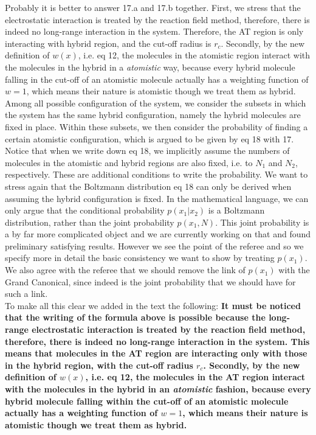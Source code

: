 \documentclass[a4paper]{article}
\begin{document}
Probably it is better to answer 17.a and 17.b together.  First, we
stress that the electrostatic interaction is treated by the reaction
field method, therefore, there is indeed no long-range interaction in
the system. Therefore, the AT region is only interacting with hybrid
region, and the cut-off radius is $r_c$. Secondly, by the new
definition of $w(x)$, i.e. eq 12, the molecules in the atomistic
region interact with the molecules in the hybrid in a 
\emph{atomistic} way, because every hybrid molecule falling in the cut-off of
an atomistic molecule actually has a weighting function of $w=1$,
which means their nature is atomistic though we treat them as hybrid.
Among all possible configuration of the system, we consider
the subsets in which the system has the same hybrid configuration,
namely the hybrid molecules are fixed in place. Within
these subsets, we then
consider the probability of finding a certain atomistic configuration,
which
is argued to be given by eq 18 with 17.
Notice that when we write down eq 18, we implicitly assume
the numbers of molecules in the atomistic and hybrid regions
are also fixed, i.e. to $N_1$ and $N_2$, respectively.
These are additional conditions to write the probability.
We want to stress again that the Boltzmann distribution eq 18
can only be derived when assuming the hybrid configuration
is fixed. In the mathematical language, we can only argue
that the conditional probability $p(x_1|x_2)$ is a Boltzmann distribution,
rather than the joint probability $p(x_1, N)$. This joint probability is a by far more complicated object and we are currently working on that and found preliminary satisfying results. 
However we see the point of the referee and so we specify more in detail the basic consistency we want to show by treating $p(x_1)$. We also agree with the referee that we should remove the link of $p(x_1)$ with the Grand Canonical, since indeed is the joint probability that we should have for such a link.\\
To make all this clear we added in the text the following: {\bf It must be noticed that the writing of the formula above is possible because the long-range electrostatic interaction is treated by the reaction
field method, therefore, there is indeed no long-range interaction in
the system. This means that molecules in the AT region are interacting only with those in the hybrid
region, with the cut-off radius $r_c$. Secondly, by the new
definition of $w(x)$, i.e. eq 12, the molecules in the AT
region interact with the molecules in the hybrid in an 
\emph{atomistic} fashion, because every hybrid molecule falling within the cut-off of
an atomistic molecule actually has a weighting function of $w=1$,
which means their nature is atomistic though we treat them as hybrid.}\\
\end{document}
